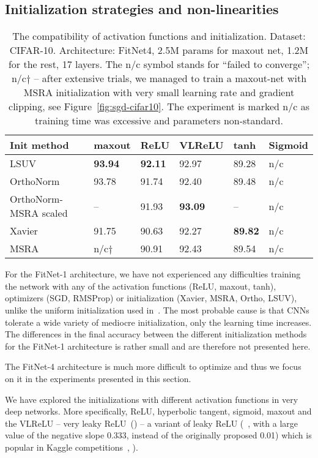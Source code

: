 \documentclass{article} \clearpage{}\usepackage{iclr2016_conference,times}
\begin{document}
\subsection{Initialization strategies and non-linearities}
\begin{table}[htb]
\caption{The compatibility of activation functions and initialization.
\hspace{\textwidth}
Dataset: CIFAR-10. Architecture: FitNet4, 2.5M params for maxout net, 1.2M for the rest, 17 layers. The n/c symbol stands for ``failed to converge''; n/c$\dagger$ -- after extensive trials, we managed to train a maxout-net with MSRA initialization with very small learning rate and gradient clipping, see Figure~\ref{fig:sgd-cifar10}. The experiment is marked n/c as training time was excessive and parameters non-standard.}
\label{tab:activations}
\centering
\begin{tabular}{llllll}
\hline
Init method & maxout & ReLU  & VLReLU & tanh & Sigmoid \\
\hline
LSUV           & \textbf{93.94} & \textbf{92.11} & 92.97  & 89.28 & n/c \\
OrthoNorm      & 93.78          & 91.74          & 92.40           & 89.48 & n/c \\
OrthoNorm-MSRA scaled & --       & 91.93   & \textbf{93.09}  & -- & n/c \\
Xavier         & 91.75          & 90.63          & 92.27   & \textbf{89.82} & n/c \\
MSRA           & n/c$\dagger$   & 90.91          & 92.43           & 89.54 & n/c \\
\hline
\end{tabular}
\end{table}
 For the FitNet-1 architecture, we have not experienced any difficulties training the network with any of the activation functions (ReLU, maxout, tanh), optimizers (SGD, RMSProp) or initialization (Xavier, MSRA, Ortho, LSUV), unlike the uniform initialization used in~\cite{FitNets2014}. The most probable cause is that CNNs tolerate a wide variety of mediocre initialization, only the learning time increases.
The differences in the final accuracy between the different initialization methods for the FitNet-1 architecture is rather small and are therefore not presented here. 

The FitNet-4 architecture is much more difficult to optimize and thus we focus on it in the experiments
presented in this section.

We have explored the initializations with different activation functions in very deep networks. More specifically, ReLU, hyperbolic tangent, sigmoid, maxout and the VLReLU -- very leaky ReLU~(\cite{SparseConvNet2014}) -- a variant of leaky ReLU (~\cite{Maas2013}, with a large value of the negative slope 0.333, instead of the originally proposed 0.01) which is popular in Kaggle competitions~\cite{deepsea}, \cite{GrahamCIFAR}).
\end{document}
